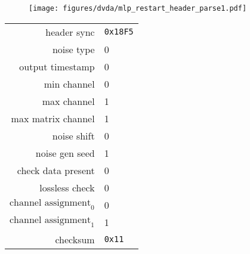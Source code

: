 \begin{figure}[h]
  \texttt{[image: figures/dvda/mlp\_restart\_header\_parse1.pdf]}
\end{figure}
\begin{table}[h]
{
  \begin{tabular}{rl}
    header sync & \texttt{0x18F5} \\
    noise type & 0 \\
    output timestamp & 0 \\
    min channel & 0 \\
    max channel & 1 \\
    max matrix channel & 1 \\
    noise shift & 0 \\
    noise gen seed & 1 \\
    check data present & 0 \\
    lossless check & 0 \\
    $\text{channel assignment}_0$ & 0 \\
    $\text{channel assignment}_1$ & 1 \\
    checksum & \texttt{0x11} \\
  \end{tabular}
}
\end{table}

\clearpage

